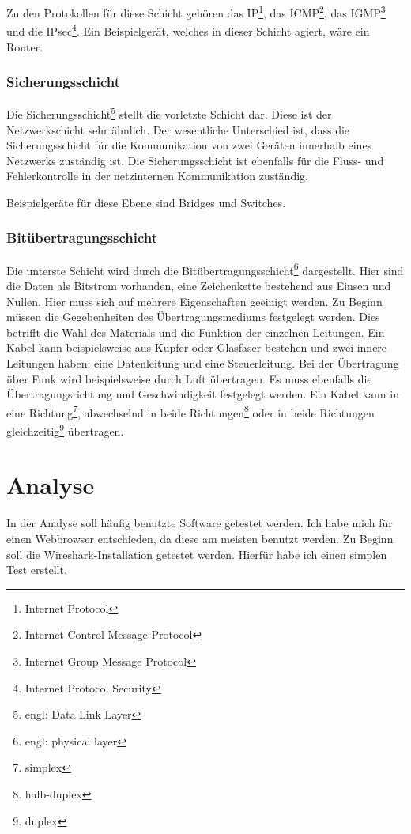 \documentclass[12pt]{article}
\begin{document}
	Zu den Protokollen für diese Schicht gehören das IP\footnote{Internet Protocol}, das ICMP\footnote{Internet Control Message Protocol}, das IGMP\footnote{Internet Group Message Protocol} und die IPsec\footnote{Internet Protocol Security}. Ein Beispielgerät, welches in dieser Schicht agiert, wäre ein Router.
	
\subsubsection{Sicherungsschicht}
	Die Sicherungsschicht\footnote{engl: Data Link Layer} stellt die vorletzte Schicht dar. Diese ist der Netzwerkschicht sehr ähnlich. Der wesentliche Unterschied ist, dass die Sicherungsschicht für die Kommunikation von zwei Geräten innerhalb eines Netzwerks zuständig ist. Die Sicherungsschicht ist ebenfalls für die Fluss- und Fehlerkontrolle in der netzinternen Kommunikation zuständig. 
	
	Beispielgeräte für diese Ebene sind Bridges und Switches.

\subsubsection{Bitübertragungsschicht}
	Die unterste Schicht wird durch die Bitübertragungsschicht\footnote{engl: physical layer} dargestellt. Hier sind die Daten als Bitstrom vorhanden, eine Zeichenkette bestehend aus Einsen und Nullen. Hier muss sich auf mehrere Eigenschaften geeinigt werden. Zu Beginn müssen die Gegebenheiten des Übertragungsmediums festgelegt werden. Dies betrifft die Wahl des Materials und die Funktion der einzelnen Leitungen. Ein Kabel kann beispielsweise aus Kupfer oder Glasfaser bestehen und zwei innere Leitungen haben: eine Datenleitung und eine Steuerleitung. Bei der Übertragung über Funk wird beispielsweise durch Luft übertragen. Es muss ebenfalls die Übertragungsrichtung und Geschwindigkeit festgelegt werden. Ein Kabel kann in eine Richtung\footnote{simplex}, abwechselnd in beide Richtungen\footnote{halb-duplex} oder in beide Richtungen gleichzeitig\footnote{duplex} übertragen.


\section{Analyse}
In der Analyse soll häufig benutzte Software getestet werden. Ich habe mich für einen Webbrowser entschieden, da diese am meisten benutzt werden.\cite{beliebteste-programme} Zu Beginn soll die Wireshark-Installation getestet werden. Hierfür habe ich einen simplen Test erstellt.
\end{document}
